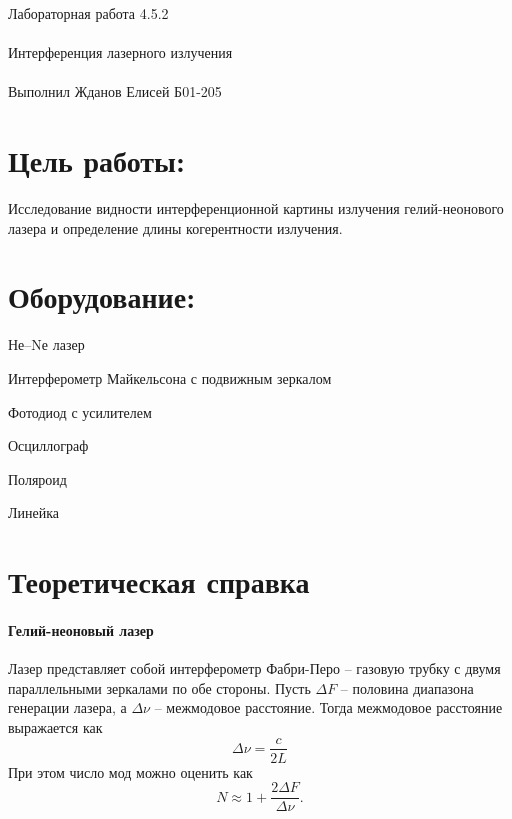\documentclass{astroedu-lab}
\begin{document}
\pagestyle{plain}

\begin{problem}{\huge Лабораторная работа 4.5.2\\\\Интерференция лазерного излучения\\\\Выполнил Жданов Елисей Б01-205}

\section{Цель работы:}

Исследование видности интерференционной картины излучения гелий-неонового лазера и определение длины когерентности излучения.

\section{Оборудование:}

Не–Nе лазер

Интерферометр Майкельсона с подвижным зеркалом

Фотодиод с усилителем

Осциллограф

Поляроид

Линейка

\section{Теоретическая справка}

\paragraph*{Гелий-неоновый лазер}
Лазер представляет собой интерферометр Фабри-Перо -- газовую трубку с двумя параллельными зеркалами по обе стороны. Пусть $\Delta F$ -- половина диапазона генерации лазера, а $\Delta \nu$ -- межмодовое расстояние. Тогда межмодовое расстояние выражается как
\begin{equation}
    \Delta \nu = \dfrac{c}{2L}
\end{equation}
При этом число мод можно оценить как 
\begin{equation}
N \approx 1 + \dfrac{2\Delta F}{\Delta \nu}.
\end{equation}

\end{problem}
\end{document}
